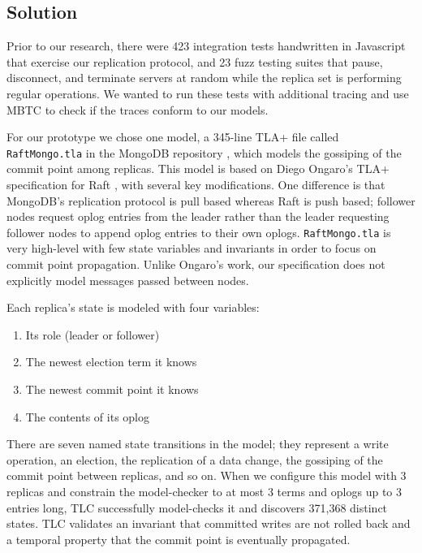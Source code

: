 \documentclass{vldb}
\begin{document}
\subsection{Solution}
\label{subsec:mbtc_solution}

Prior to our research, there were 423 integration tests handwritten in Javascript that exercise our replication protocol, and 23 fuzz testing suites that pause, disconnect, and terminate servers at random while the replica set is performing regular operations. 
We wanted to run these tests with additional tracing and use MBTC to check if the traces conform to our models.

For our prototype we chose one model, a 345-line TLA+ file called \texttt{RaftMongo.tla} in the MongoDB repository \cite{MongoGitHub}, which models the gossiping of the commit point among replicas.
This model is based on Diego Ongaro's TLA+ specification for Raft \cite{Ongaro14TLA+Raft}, with several key modifications.
One difference is that MongoDB's replication protocol is pull based whereas Raft is push based; follower nodes request oplog entries from the leader rather than the leader requesting follower nodes to append oplog entries to their own oplogs.
\texttt{RaftMongo.tla} is very high-level with few state variables and invariants in order to focus on commit point propagation. Unlike Ongaro's work, our specification does not explicitly model messages passed between nodes.

Each replica's state is modeled with four variables:

\begin{enumerate}
\item Its role (leader or follower)
\item The newest election term it knows
\item The newest commit point it knows
\item The contents of its oplog
\end{enumerate}

There are seven named state transitions in the model; they represent a write operation, an election, the replication of a data change, the gossiping of the commit point between replicas, and so on. 
When we configure this model with 3 replicas and constrain the model-checker to at most 3 terms and oplogs up to 3 entries long, TLC successfully model-checks it and discovers 371,368 distinct states.
TLC validates an invariant that committed writes are not rolled back and a temporal property that the commit point is eventually propagated.
\end{document}
